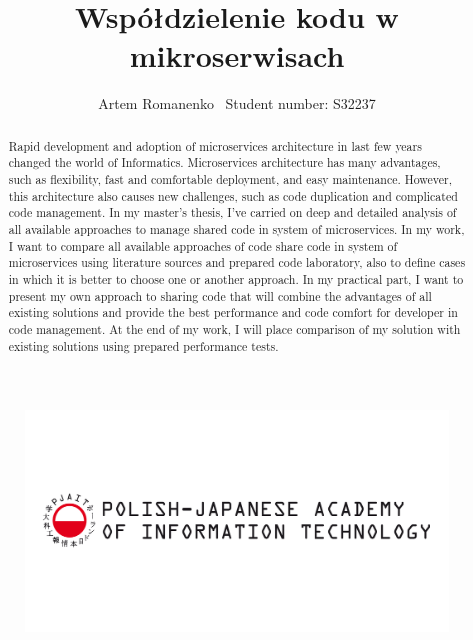 \documentclass[runningheads,12pt]{llncs}
\begin{document}
\title{Współdzielenie kodu w mikroserwisach} \subtitle{}

\author{Artem Romanenko \ Student number: S32237 \inst{}}
\authorrunning{ }

\thispagestyle{fancy}

\begin{figure}[t!]
    \centering
    \includegraphics[width=\linewidth]{images/Logo_EN_1.png}
    \label{fig:my_label}
\end{figure}


\clearpage

\makeatletter
\renewcommand*\l@author[2]{}
\renewcommand*\l@title[2]{}
\makeatletter

\begin{abstract}
Rapid development and adoption of microservices architecture in last few years changed the world of Informatics. Microservices architecture has many advantages, such as flexibility, fast and comfortable deployment, and easy maintenance. However, this architecture also causes new challenges, such as code duplication and complicated code management. In my master's thesis, I've carried on deep and detailed analysis of all available approaches to manage shared code in system of microservices. In my work, I want to compare all available approaches of code share code in system of microservices using literature sources and prepared code laboratory, also to define cases in which it is better to choose one or another approach. In my practical part, I want to present my own approach to sharing code that will combine the advantages of all existing solutions and provide the best performance and code comfort for developer in code management. At the end of my work, I will place comparison of my solution with existing solutions using prepared performance tests.
\end{abstract}
\end{document}
